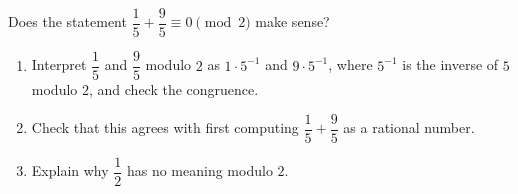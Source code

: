 Does the statement $\dfrac15+\dfrac95\equiv0\pmod2$ make sense?
\begin{enumerate}
\item[(a)] Interpret $\dfrac15$ and $\dfrac95$ modulo $2$ as $1\cdot5^{-1}$ and $9\cdot5^{-1}$, where $5^{-1}$ is the inverse of $5$ modulo $2$, and check the congruence.
\item[(b)] Check that this agrees with first computing $\dfrac15+\dfrac95$ as a rational number.
\item[(c)] Explain why $\dfrac12$ has no meaning modulo $2$.
\end{enumerate}
